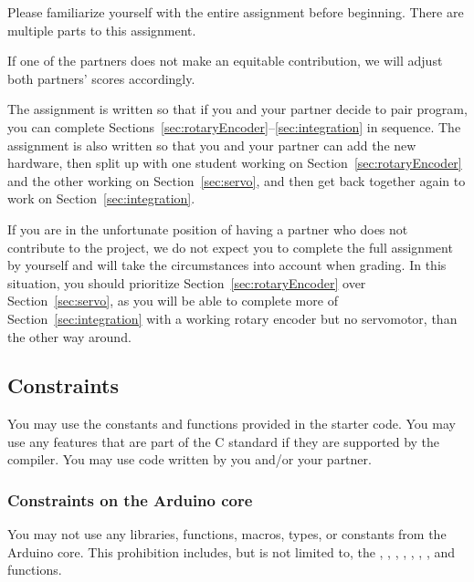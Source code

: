 Please familiarize yourself with the entire assignment before beginning.
There are multiple parts to this assignment.

If one of the partners does not make an equitable contribution, we will adjust both partners' scores accordingly.

The assignment is written so that if you and your partner decide to pair program, you can complete Sections~\ref{sec:rotaryEncoder}--\ref{sec:integration} in sequence.
The assignment is also written so that you and your partner can add the new hardware, then split up with one student working on Section~\ref{sec:rotaryEncoder} and the other working on Section~\ref{sec:servo}, and then get back together again to work on Section~\ref{sec:integration}.

If you are in the unfortunate position of having a partner who does not contribute to the project, we do not expect you to complete the full assignment by yourself and will take the circumstances into account when grading.
In this situation, you should prioritize Section~\ref{sec:rotaryEncoder} over Section~\ref{sec:servo}, as you will be able to complete more of Section~\ref{sec:integration} with a working rotary encoder but no servomotor, than the other way around.

\subsection{Constraints} \label{subsec:constraints}

You may use the constants and functions provided in the starter code.
You may use any features that are part of the C standard if they are supported by the compiler.
You may use code written by you and/or your partner.

\subsubsection{Constraints on the Arduino core}


You may not use any %
libraries, functions, macros, types, or constants from the Arduino core.
This prohibition includes, but is not limited to, the , , , , , , , and  functions.

